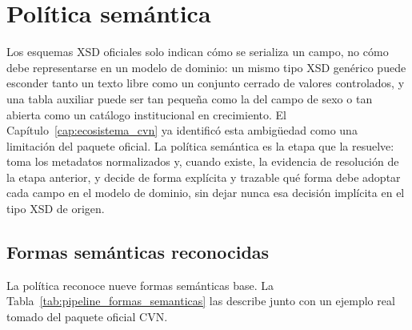 \section{Política semántica}
\label{sec:pipeline_politica_semantica}

Los esquemas XSD oficiales solo indican cómo se serializa un campo, no cómo
debe representarse en un modelo de dominio: un mismo tipo XSD genérico puede
esconder tanto un texto libre como un conjunto cerrado de valores
controlados, y una tabla auxiliar puede ser tan pequeña como la del campo de
sexo o tan abierta como un catálogo institucional en crecimiento. El
Capítulo~\ref{cap:ecosistema_cvn} ya identificó esta ambigüedad como una
limitación del paquete oficial. La política semántica es la etapa que la
resuelve: toma los metadatos normalizados y, cuando existe, la evidencia de
resolución de la etapa anterior, y decide de forma explícita y trazable qué
forma debe adoptar cada campo en el modelo de dominio, sin dejar nunca esa
decisión implícita en el tipo XSD de origen.

\subsection{Formas semánticas reconocidas}
\label{sec:pipeline_politica_formas}

La política reconoce nueve formas semánticas base. La Tabla~\ref{tab:pipeline_formas_semanticas}
las describe junto con un ejemplo real tomado del paquete oficial CVN.

